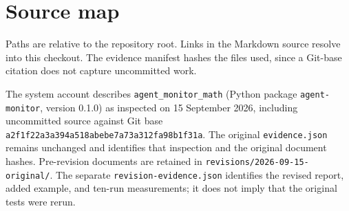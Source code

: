 \documentclass[10pt,letterpaper]{article}
\begin{document}
\appendix

\section{Source map}

Paths are relative to the repository root. Links in the Markdown source resolve into this checkout. The evidence manifest hashes the files used, since a Git-base citation does not capture uncommitted work.

The system account describes \nolinkurl{agent_monitor_math} (Python package \nolinkurl{agent-monitor}, version 0.1.0) as inspected on 15 September 2026, including uncommitted source against Git base \nolinkurl{a2f1f22a3a394a518abebe7a73a312fa98b1f31a}. The original \nolinkurl{evidence.json} remains unchanged and identifies that inspection and the original document hashes. Pre-revision documents are retained in \nolinkurl{revisions/2026-09-15-original/}. The separate \nolinkurl{revision-evidence.json} identifies the revised report, added example, and ten-run measurements; it does not imply that the original tests were rerun.
\end{document}
